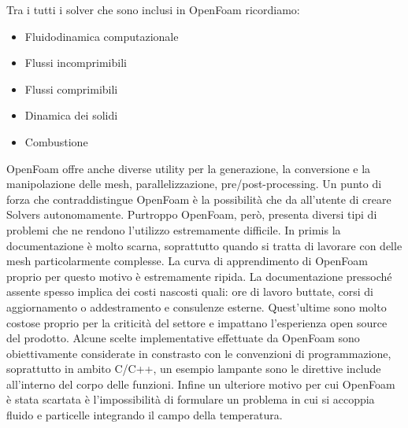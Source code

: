     Tra i tutti i solver che sono inclusi in OpenFoam ricordiamo:
    \begin{itemize}
        \item Fluidodinamica computazionale
        \item Flussi incomprimibili
        \item Flussi comprimibili
        \item Dinamica dei solidi
        \item Combustione
    \end{itemize}
    OpenFoam offre anche diverse utility per la generazione, la conversione e la manipolazione delle mesh,
    parallelizzazione, pre/post-processing.
    Un punto di forza che contraddistingue OpenFoam è la possibilità che da all'utente di creare Solvers autonomamente.
    Purtroppo OpenFoam, però, presenta diversi tipi di problemi che ne rendono l'utilizzo estremamente difficile.
    In primis la documentazione è molto scarna, soprattutto quando si tratta di lavorare con delle mesh particolarmente complesse. La curva di apprendimento di OpenFoam proprio per questo motivo è estremamente ripida.
    La documentazione pressoché assente spesso implica dei costi nascosti quali: ore di lavoro buttate, corsi di aggiornamento o addestramento e consulenze esterne.
    Quest'ultime sono molto costose proprio per la criticità del settore e impattano l'esperienza open source del prodotto.
    Alcune scelte implementative effettuate da OpenFoam sono obiettivamente considerate in constrasto con le convenzioni di programmazione, soprattutto in ambito C/C++,
    un esempio lampante sono le direttive include all'interno del corpo delle funzioni.
    Infine un ulteriore motivo per cui OpenFoam è stata scartata è l'impossibilità di formulare un problema in cui si accoppia fluido e particelle integrando il campo della temperatura.

